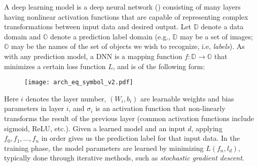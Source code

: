 \documentclass[conference]{IEEEtran}
\begin{document}
A deep learning model is a deep neural network (\dnn) consisting of many layers having nonlinear activation functions that are capable of representing complex transformations between input data and desired output.
Let $\mathbb D$ denote a data domain and $\mathbb O$ denote a prediction label domain (e.g., $\mathbb D$ may be a set of images; $\mathbb O$ may be the names of the set of objects we wish to recognize, i.e, {\em labels}). As with any prediction model, a DNN is a mapping function $f:\mathbb{D}\to\mathbb{O}$ that
minimizes a certain loss function $L$, and is of the following form:\\
\begin{figure}[!h]
\centering
\texttt{[image: arch\_eq\_symbol\_v2.pdf]}
\end{figure}


\noindent Here $i$ denotes the layer number,  $(W_i, b_i)$ are learnable weights and bias parameters in layer $i$, and $\sigma_i$ is an activation function that non-linearly transforms the result of the previous layer (common activation functions include sigmoid, ReLU, etc.). 
Given a learned model and an input $d$, applying $f_0, f_1, ..., f_{n}$ in order gives us the prediction label for that input data. 
In the training phase, the model parameters are learned by minimizing $L(f_{n}, l_d)$,
typically done through iterative methods, such as {\em stochastic gradient descent}.


\end{document}
